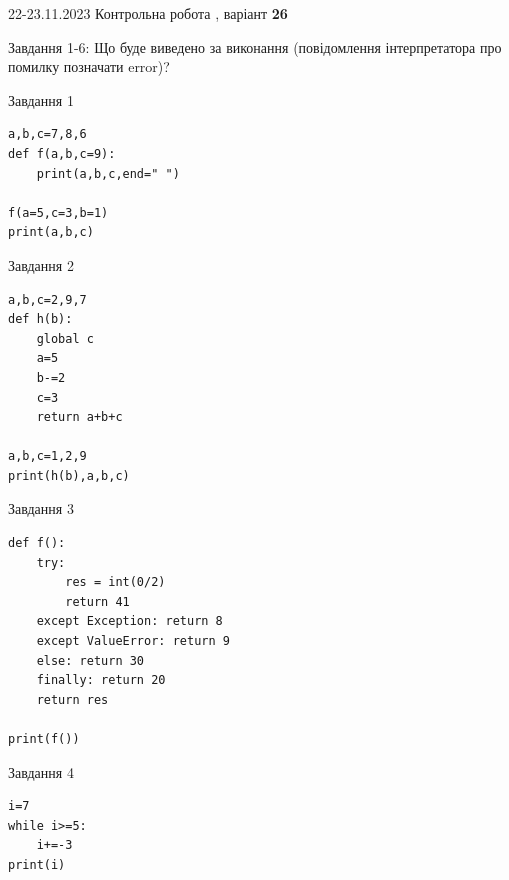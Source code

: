 \documentclass[12pt, ukrainian]{article}
\begin{document}
{{22-23.11.2023 Контрольна робота , варіант  \No \textbf { 26 }\par}}
{

Завдання 1-6: Що буде виведено за виконання (повідомлення інтерпретатора про помилку позначати error)?


\begin{minipage}[t]{9.7cm}                
{\begin{center}Завдання {1}\end{center}}
\begin{verbatim}
a,b,c=7,8,6
def f(a,b,c=9):
    print(a,b,c,end=" ")

f(a=5,c=3,b=1)
print(a,b,c)
\end{verbatim}     
\end{minipage}
\vline \hspace{8mm}
\begin{minipage}[t]{8.0cm}                
{\begin{center}Завдання {2}\end{center}}
\begin{verbatim}
a,b,c=2,9,7
def h(b):
    global c
    a=5
    b-=2
    c=3
    return a+b+c

a,b,c=1,2,9
print(h(b),a,b,c)
\end{verbatim}     
\end{minipage}

\vspace{15mm}
\begin{minipage}[t]{9.7cm}                
{\begin{center}Завдання {3}\end{center}}
\begin{verbatim}
def f():
    try:
        res = int(0/2)
        return 41
    except Exception: return 8
    except ValueError: return 9
    else: return 30
    finally: return 20
    return res

print(f())
\end{verbatim}     
\end{minipage}
\vline \hspace{8mm}
\begin{minipage}[t]{8.0cm}                
{\begin{center}Завдання {4}\end{center}}
\begin{verbatim}
i=7
while i>=5:
    i+=-3
print(i)
\end{verbatim}     
\end{minipage}

}
\end{document}
